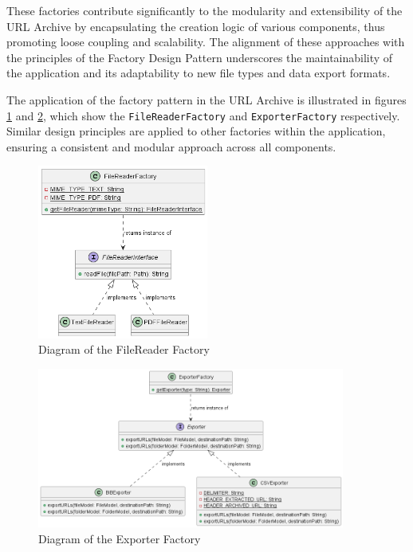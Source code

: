 These factories contribute significantly to the modularity and extensibility of the URL Archive by encapsulating the creation logic of various components, thus promoting loose coupling and scalability. The alignment of these approaches with the principles of the Factory Design Pattern underscores the maintainability of the application and its adaptability to new file types and data export formats.

The application of the factory pattern in the URL Archive is illustrated in figures \ref{fig:FileReaderFactory_Diagram} and \ref{fig:ExporterFactory_Diagram}, which show the \texttt{FileReaderFactory} and \texttt{ExporterFactory} respectively. Similar design principles are applied to other factories within the application, ensuring a consistent and modular approach across all components.

\begin{figure}[h!]
    \center
    \includegraphics[width=0.5\textwidth]{pictures/FileReaderFactory-0.png}
    \caption{Diagram of the FileReader Factory}
    \label{fig:FileReaderFactory_Diagram}
\end{figure}

\begin{figure}[h!]
    \center
    \includegraphics[width=0.9\textwidth]{pictures/ExporterFactory-0.png}
    \caption{Diagram of the Exporter Factory}
    \label{fig:ExporterFactory_Diagram}
\end{figure}

